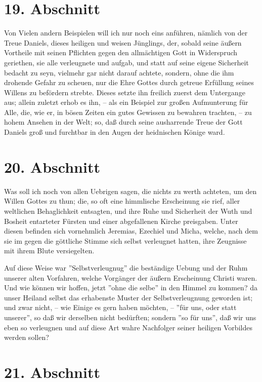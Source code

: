 \section{19. Abschnitt} \label{kap4_ab19}

Von Vielen andern Beispielen will ich nur noch eins anführen, nämlich von der
Treue Daniels, dieses heiligen und weisen Jünglings, der, sobald seine äußern
Vortheile mit seinen Pflichten gegen den allmächtigen Gott in Widerspruch
geriethen, sie alle verleugnete und aufgab, und statt auf seine eigene
Sicherheit bedacht zu seyn, vielmehr gar nicht darauf achtete, sondern, ohne die
ihm drohende Gefahr zu scheuen, nur die Ehre Gottes durch getreue Erfüllung
seines Willens zu befördern strebte. Dieses setzte ihn freilich zuerst dem
Untergange aus; allein zuletzt erhob es ihn, -- als ein Beispiel zur großen
Aufmunterung für Alle, die, wie er, in bösen Zeiten ein gutes Gewissen zu
bewahren trachten, -- zu hohem Ansehen in der Welt; so, daß durch seine
ausharrende Treue der Gott Daniels groß und furchtbar in den Augen der
heidnischen Könige ward.

\section{20. Abschnitt} \label{kap4_ab20}

Was soll ich noch von allen Uebrigen sagen, die nichts zu werth achteten, um den
Willen Gottes zu thun; die, so oft eine himmlische Erscheinung sie rief, aller
weltlichen Behaglichkeit entsagten, und ihre Ruhe und Sicherheit der Wuth und
Bosheit entarteter Fürsten und einer abgefallenen Kirche preisgaben. Unter
diesen befinden sich vornehmlich Jeremias, Ezechiel und Micha, welche, nach dem
sie im gegen die göttliche Stimme sich selbst verleugnet hatten, ihre Zeugnisse
mit ihrem Blute versiegelten.

\medskip

Auf diese Weise war ''Selbstverleugnug'' die beständige Uebung und der Ruhm
unserer alten Vorfahren, welche Vorgänger der äußern Erscheinung Christi waren.
Und wie können wir hoffen, jetzt ''ohne die selbe'' in den Himmel zu kommen? da
unser Heiland selbst das erhabenste Muster der Selbstverleugnung geworden ist;
und zwar nicht, -- wie Einige es gern haben möchten, -- ''für uns, oder statt
unserer'', so daß wir derselben nicht bedürften; sondern ''so für uns'', daß wir
uns eben so verleugnen und auf diese Art wahre Nachfolger seiner heiligen
Vorbildes werden sollen?

\section{21. Abschnitt} \label{kap4_ab21}

